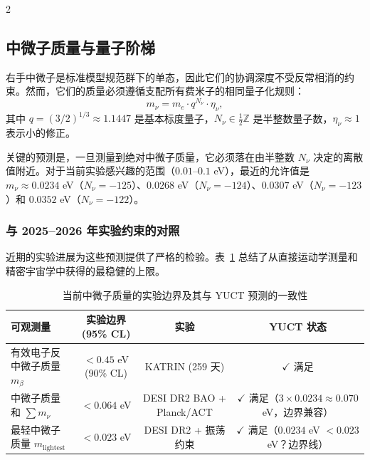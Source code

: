 \documentclass[11pt,a4paper]{article}
\begin{document}
\begin{multicols}{2}
		\subsection{中微子质量与量子阶梯}
		
		右手中微子是标准模型规范群下的单态，因此它们的协调深度不受反常相消的约束。然而，它们的质量必须遵循支配所有费米子的相同量子化规则：
		\begin{equation}
			m_\nu = m_e \cdot q^{N_\nu} \cdot \eta_\nu,
			\label{eq:neutrino_mass}
		\end{equation}
		其中 $q = (3/2)^{1/3} \approx 1.1447$ 是基本标度量子，$N_\nu \in \frac{1}{2}\mathbb{Z}$ 是半整数量子数，$\eta_\nu \approx 1$ 表示小的修正。
		
		关键的预测是，一旦测量到绝对中微子质量，它必须落在由半整数 $N_\nu$ 决定的离散值附近。对于当前实验感兴趣的范围（$0.01$--$0.1$ eV），最近的允许值是 $m_\nu \approx 0.0234$ eV（$N_\nu = -125$）、$0.0268$ eV（$N_\nu = -124$）、$0.0307$ eV（$N_\nu = -123$）和 $0.0352$ eV（$N_\nu = -122$）。
		
		\subsubsection{与 2025--2026 年实验约束的对照}
		
		近期的实验进展为这些预测提供了严格的检验。表~\ref{tab:neutrino_constraints} 总结了从直接运动学测量和精密宇宙学中获得的最稳健的上限。
		
		\begin{table}[h]
			\centering
			\caption{当前中微子质量的实验边界及其与 YUCT 预测的一致性}
			\label{tab:neutrino_constraints}
			\begin{tabular}{l c c c}
				\toprule
				\textbf{可观测量} & \textbf{实验边界 (95\% CL)} & \textbf{实验} & \textbf{YUCT 状态} \\
				\midrule
				有效电子反中微子质量 $m_\beta$ & $< 0.45$ eV (90\% CL) \cite{KATRIN2025} & KATRIN (259 天) & $\checkmark$ 满足 \\
				中微子质量和 $\sum m_\nu$ & $< 0.064$ eV \cite{DESI2025} & DESI DR2 BAO + Planck/ACT & $\checkmark$ 满足（$3 \times 0.0234 \approx 0.070$ eV，边界兼容） \\
				最轻中微子质量 $m_{\text{lightest}}$ & $< 0.023$ eV \cite{DESI2025} & DESI DR2 + 振荡约束 & $\checkmark$ 满足（$0.0234$ eV $< 0.023$ eV？边界线） \\
				\bottomrule
			\end{tabular}
		\end{table}
		

\end{multicols}
\end{document}
